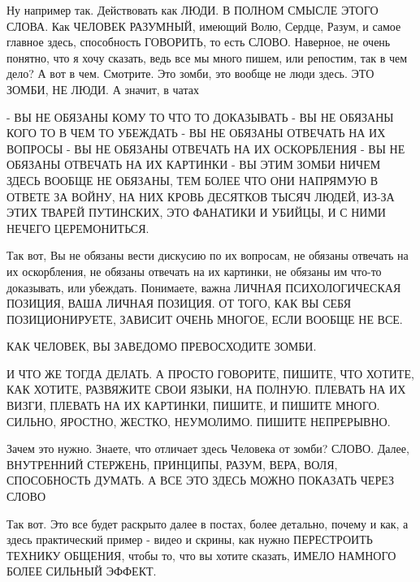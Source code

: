 Ну например так. Действовать как ЛЮДИ. В ПОЛНОМ СМЫСЛЕ ЭТОГО СЛОВА. Как ЧЕЛОВЕК
РАЗУМНЫЙ, имеющий Волю, Сердце, Разум, и самое главное здесь, способность
ГОВОРИТЬ, то есть СЛОВО. Наверное, не очень понятно, что я хочу сказать, ведь
все мы много пишем, или репостим, так в чем дело? А вот в чем. Смотрите. Это
зомби, это вообще не люди здесь. ЭТО ЗОМБИ, НЕ ЛЮДИ. А значит, в чатах

- ВЫ НЕ ОБЯЗАНЫ КОМУ ТО ЧТО ТО ДОКАЗЫВАТЬ
- ВЫ НЕ ОБЯЗАНЫ КОГО ТО В ЧЕМ ТО УБЕЖДАТЬ
- ВЫ НЕ ОБЯЗАНЫ ОТВЕЧАТЬ НА ИХ ВОПРОСЫ
- ВЫ НЕ ОБЯЗАНЫ ОТВЕЧАТЬ НА ИХ ОСКОРБЛЕНИЯ
- ВЫ НЕ ОБЯЗАНЫ ОТВЕЧАТЬ НА ИХ КАРТИНКИ
- ВЫ ЭТИМ ЗОМБИ НИЧЕМ ЗДЕСЬ ВООБЩЕ НЕ ОБЯЗАНЫ, ТЕМ БОЛЕЕ ЧТО ОНИ НАПРЯМУЮ В
ОТВЕТЕ ЗА ВОЙНУ, НА НИХ КРОВЬ ДЕСЯТКОВ ТЫСЯЧ ЛЮДЕЙ, ИЗ-ЗА ЭТИХ ТВАРЕЙ
ПУТИНСКИХ, ЭТО ФАНАТИКИ И УБИЙЦЫ, И С НИМИ НЕЧЕГО ЦЕРЕМОНИТЬСЯ.

Так вот, Вы не обязаны вести дискусию по их вопросам, не обязаны отвечать на их
оскорбления, не обязаны отвечать на их картинки, не обязаны им что-то
доказывать, или убеждать. Понимаете, важна ЛИЧНАЯ ПСИХОЛОГИЧЕСКАЯ ПОЗИЦИЯ, ВАША
ЛИЧНАЯ ПОЗИЦИЯ. ОТ ТОГО, КАК ВЫ СЕБЯ ПОЗИЦИОНИРУЕТЕ, ЗАВИСИТ ОЧЕНЬ МНОГОЕ, ЕСЛИ
ВООБЩЕ НЕ ВСЕ.

КАК ЧЕЛОВЕК, ВЫ ЗАВЕДОМО ПРЕВОСХОДИТЕ ЗОМБИ.

И ЧТО ЖЕ ТОГДА ДЕЛАТЬ. А ПРОСТО ГОВОРИТЕ, ПИШИТЕ, ЧТО ХОТИТЕ, КАК ХОТИТЕ,
РАЗВЯЖИТЕ СВОИ ЯЗЫКИ, НА ПОЛНУЮ. ПЛЕВАТЬ НА ИХ ВИЗГИ, ПЛЕВАТЬ НА ИХ КАРТИНКИ,
ПИШИТЕ, И ПИШИТЕ МНОГО. СИЛЬНО, ЯРОСТНО, ЖЕСТКО, НЕУМОЛИМО. ПИШИТЕ НЕПРЕРЫВНО.

Зачем это нужно. Знаете, что отличает здесь Человека от зомби? СЛОВО.  Далее,
ВНУТРЕННИЙ СТЕРЖЕНЬ, ПРИНЦИПЫ, РАЗУМ, ВЕРА, ВОЛЯ, СПОСОБНОСТЬ ДУМАТЬ. А ВСЕ ЭТО
ЗДЕСЬ МОЖНО ПОКАЗАТЬ ЧЕРЕЗ СЛОВО

Так вот. Это все будет раскрыто далее в постах, более детально, почему и как, а
здесь практический пример - видео и скрины, как нужно ПЕРЕСТРОИТЬ ТЕХНИКУ
ОБЩЕНИЯ, чтобы то, что вы хотите сказать, ИМЕЛО НАМНОГО БОЛЕЕ СИЛЬНЫЙ ЭФФЕКТ.

